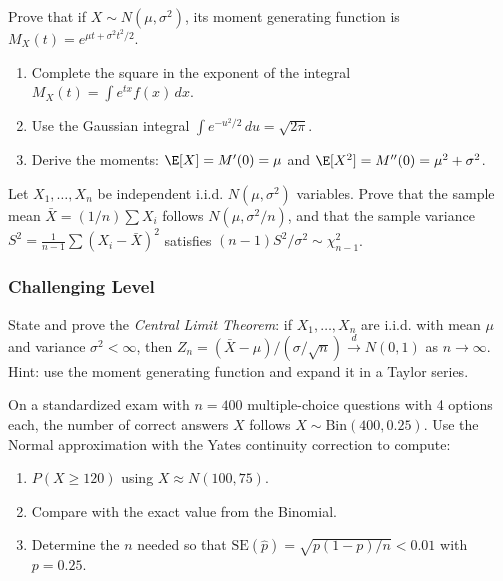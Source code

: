 \begin{problema}
	\label{prob:4.6.7}
	Prove that if $X \sim N(\mu, \sigma^{2})$, its moment generating function is $M_{X}(t) = e^{\mu t + \sigma^{2} t^{2}/2}$.
	\begin{enumerate}
		\item Complete the square in the exponent of the integral $M_{X}(t) = \int e^{tx} f(x)\,dx$.
		\item Use the Gaussian integral $\int e^{-u^{2}/2}\,du = \sqrt{2\pi}$.
		\item Derive the moments: $\E[X] = M'(0) = \mu$ and $\E[X^{2}] = M''(0) = \mu^{2} + \sigma^{2}$.
	\end{enumerate}
\end{problema}

\begin{problema}
	\label{prob:4.6.8}
	Let $X_{1}, \dots, X_{n}$ be independent i.i.d. $N(\mu, \sigma^{2})$ variables. Prove that the sample mean $\bar{X} = (1/n) \sum X_{i}$ follows $N(\mu, \sigma^{2}/n)$, and that the sample variance $S^{2} = \frac{1}{n-1}\sum(X_{i} - \bar{X})^{2}$ satisfies $(n-1)S^{2}/\sigma^{2} \sim \chi^{2}_{n-1}$.
\end{problema}

\subsubsection*{Challenging Level}

\begin{problema}
	\label{prob:4.6.9}
	State and prove the \emph{Central Limit Theorem}: if $X_{1}, \dots, X_{n}$ are i.i.d. with mean $\mu$ and variance $\sigma^{2} < \infty$, then $Z_{n} = (\bar{X} - \mu)/(\sigma/\sqrt{n}) \xrightarrow{d} N(0, 1)$ as $n \to \infty$. Hint: use the moment generating function and expand it in a Taylor series.
\end{problema}

\begin{problema}
	\label{prob:4.6.10}
	On a standardized exam with $n = 400$ multiple-choice questions with 4 options each, the number of correct answers $X$ follows $X \sim \text{Bin}(400, 0.25)$. Use the Normal approximation with the Yates continuity correction to compute:
	\begin{enumerate}
		\item $P(X \ge 120)$ using $X \approx N(100, 75)$.
		\item Compare with the exact value from the Binomial.
		\item Determine the $n$ needed so that $\text{SE}(\hat{p}) = \sqrt{p(1-p)/n} < 0.01$ with $p = 0.25$.
	\end{enumerate}
\end{problema}

